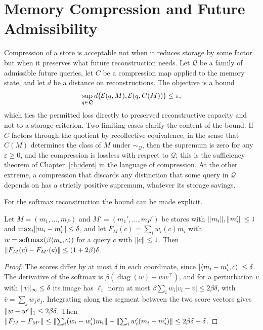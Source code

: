 \chapter{Memory Compression and Future Admissibility}\label{ch:compression}

Compression of a store is acceptable not when it reduces storage by some factor but when it preserves what future reconstruction needs. Let $\mathcal Q$ be a family of admissible future queries, let $C$ be a compression map applied to the memory state, and let $d$ be a distance on reconstructions. The objective is a bound
\begin{equation}\label{eq:compbound}
\sup_{q\in\mathcal Q}d\bigl(\mathcal{E}(q,M),\mathcal{E}(q,C(M))\bigr)\le\varepsilon,
\end{equation}
which ties the permitted loss directly to preserved reconstructive capacity and not to a storage criterion. Two limiting cases clarify the content of the bound. If $C$ factors through the quotient by recollective equivalence, in the sense that $C(M)$ determines the class of $M$ under $\sim_{\mathcal Q}$, then the supremum is zero for any $\varepsilon\ge0$, and the compression is lossless with respect to $\mathcal Q$; this is the sufficiency theorem of Chapter~\ref{ch:ident} in the language of compression. At the other extreme, a compression that discards any distinction that some query in $\mathcal Q$ depends on has a strictly positive supremum, whatever its storage savings.

For the softmax reconstruction the bound can be made explicit.

\begin{proposition}\label{prop:distort}
Let $M=(m_1,\dots,m_P)$ and $M'=(m_1',\dots,m_P')$ be stores with $\lVert m_i\rVert,\lVert m_i'\rVert\le1$ and $\max_i\lVert m_i-m_i'\rVert\le\delta$, and let $F_M(c)=\sum_iw_i(c)m_i$ with $w=\operatorname{softmax}(\beta\langle m_i,c\rangle)$ for a query $c$ with $\lVert c\rVert\le1$. Then $\lVert F_M(c)-F_{M'}(c)\rVert\le(1+2\beta)\delta$.
\end{proposition}

\begin{proof}
The scores differ by at most $\delta$ in each coordinate, since $|\langle m_i-m_i',c\rangle|\le\delta$. The derivative of the softmax is $\beta(\operatorname{diag}(w)-ww^\top)$, and for a perturbation $v$ with $\lVert v\rVert_\infty\le\delta$ its image has $\ell_1$ norm at most $\beta\sum_iw_i|v_i-\bar v|\le2\beta\delta$, with $\bar v=\sum_jw_jv_j$. Integrating along the segment between the two score vectors gives $\lVert w-w'\rVert_1\le2\beta\delta$. Then $\lVert F_M-F_{M'}\rVert\le\lVert \sum_i(w_i-w_i')m_i\rVert+\lVert \sum_iw_i'(m_i-m_i')\rVert\le2\beta\delta+\delta$.
\end{proof}

